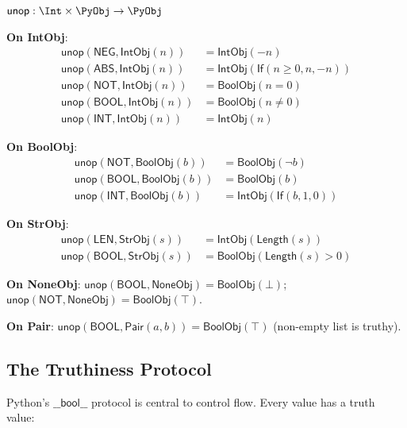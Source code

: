 \begin{definition}
$\mathsf{unop} : \Int \times \PyObj \to \PyObj$

\textbf{On IntObj}:
\begin{align}
  \mathsf{unop}(\mathsf{NEG}, \mathsf{IntObj}(n)) &=
    \mathsf{IntObj}(-n) \\
  \mathsf{unop}(\mathsf{ABS}, \mathsf{IntObj}(n)) &=
    \mathsf{IntObj}(\mathsf{If}(n \geq 0, n, -n)) \\
  \mathsf{unop}(\mathsf{NOT}, \mathsf{IntObj}(n)) &=
    \mathsf{BoolObj}(n = 0) \\
  \mathsf{unop}(\mathsf{BOOL}, \mathsf{IntObj}(n)) &=
    \mathsf{BoolObj}(n \neq 0) \\
  \mathsf{unop}(\mathsf{INT}, \mathsf{IntObj}(n)) &=
    \mathsf{IntObj}(n)
\end{align}

\textbf{On BoolObj}:
\begin{align}
  \mathsf{unop}(\mathsf{NOT}, \mathsf{BoolObj}(b)) &=
    \mathsf{BoolObj}(\lnot b) \\
  \mathsf{unop}(\mathsf{BOOL}, \mathsf{BoolObj}(b)) &=
    \mathsf{BoolObj}(b) \\
  \mathsf{unop}(\mathsf{INT}, \mathsf{BoolObj}(b)) &=
    \mathsf{IntObj}(\mathsf{If}(b, 1, 0))
\end{align}

\textbf{On StrObj}:
\begin{align}
  \mathsf{unop}(\mathsf{LEN}, \mathsf{StrObj}(s)) &=
    \mathsf{IntObj}(\mathsf{Length}(s)) \\
  \mathsf{unop}(\mathsf{BOOL}, \mathsf{StrObj}(s)) &=
    \mathsf{BoolObj}(\mathsf{Length}(s) > 0)
\end{align}

\textbf{On NoneObj}: $\mathsf{unop}(\mathsf{BOOL}, \mathsf{NoneObj})
= \mathsf{BoolObj}(\bot)$; $\mathsf{unop}(\mathsf{NOT},
\mathsf{NoneObj}) = \mathsf{BoolObj}(\top)$.

\textbf{On Pair}: $\mathsf{unop}(\mathsf{BOOL},
\mathsf{Pair}(a, b)) = \mathsf{BoolObj}(\top)$ (non-empty list is
truthy).
\end{definition}

\subsection{The Truthiness Protocol}

Python's $\mathsf{\_\_bool\_\_}$ protocol is central to control flow.
Every value has a truth value:


